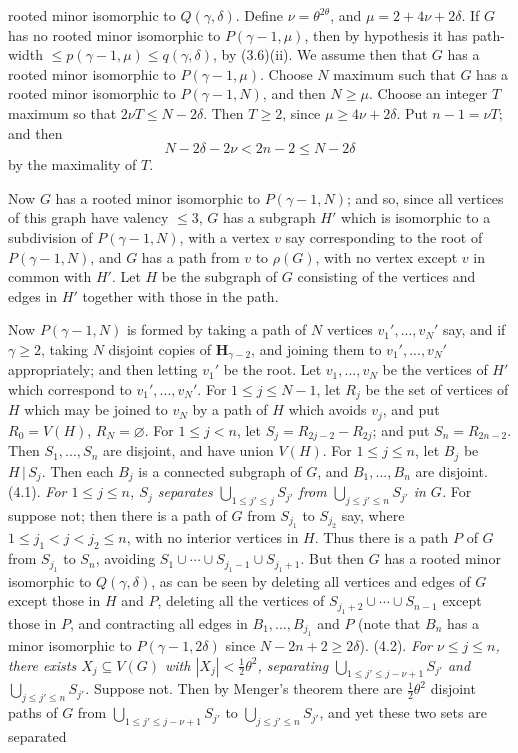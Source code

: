 \noindent rooted minor isomorphic to $Q(\gamma, \delta)$. Define $\nu=\theta^{2\theta}$, and $\mu=2+4\nu+2\delta$. If
$G$ has no rooted minor isomorphic to $P(\gamma-1, \mu)$, then by hypothesis it has
path-width $\le p(\gamma-1, \mu)\le q(\gamma, \delta)$, by (3.6)(ii). We assume then that $G$ has a
rooted minor isomorphic to $P(\gamma-1, \mu)$. Choose $N$ maximum such that $G$ has
a rooted minor isomorphic to $P(\gamma-1, N)$, and then $N\ge\mu$. Choose an integer
$T$ maximum so that $2\nu T\le N-2\delta$. Then $T\ge 2$, since $\mu\ge 4\nu+2\delta$. Put
$n-1=\nu T$; and then
\begin{equation*}
N-2\delta-2\nu<2n-2\le N-2\delta
\end{equation*}
by the maximality of $T$.

Now $G$ has a rooted minor isomorphic to $P(\gamma-1, N)$; and so, since all
vertices of this graph have valency ${\le}3$, $G$ has a subgraph $H'$ which is
isomorphic to a subdivision of $P(\gamma-1, N)$, with a vertex $v$ say
corresponding to the root of $P(\gamma-1, N)$, and $G$ has a path from $v$ to $\rho(G)$,
with no vertex except $v$ in common with $H'$. Let $H$ be the subgraph of $G$
consisting of the vertices and edges in $H'$ together with those in the path.

Now $P(\gamma-1, N)$ is formed by taking a path of $N$ vertices $v_1',..., v_N'$ say,
and if $\gamma\ge 2$, taking $N$ disjoint copies of $\mathbf{H}_{\gamma-2}$, and joining them to $v_1',..., v_N'$
appropriately; and then letting $v_1'$ be the root. Let $v_1,..., v_N$ be the vertices of
$H'$ which correspond to $v_1',..., v_N'$. For $1\le j\le N-1$, let $R_j$ be the set of
vertices of $H$ which may be joined to $v_N$ by a path of $H$ which avoids $v_j$, and
put $R_0=V(H)$, $R_N=\varnothing$. For $1\le j<n$, let $S_j=R_{2j-2}-R_{2j}$; and put
$S_n=R_{2n-2}$. Then $S_1,..., S_n$ are disjoint, and have union $V(H)$. For
$1\le j\le n$, let $B_j$ be $H\,|\,S_j$. Then each $B_j$ is a connected subgraph of $G$, and
$B_1,..., B_n$ are disjoint.
\stmt
(4.1). \textit{For $1\le j\le n$, $S_j$ separates $\bigcup_{1\le j'\le j}S_{j'}$ from $\bigcup_{j\le j'\le n}S_{j'}$ in $G$.}
\stmt
For suppose not; then there is a path of $G$ from $S_{j_1}$ to $S_{j_2}$ say, where
$1\le j_1<j<j_2\le n$, with no interior vertices in $H$. Thus there is a path $P$ of
$G$ from $S_{j_1}$ to $S_n$, avoiding $S_1\cup\cdots\cup S_{j_1-1}\cup S_{j_1+1}$. But then $G$ has a
rooted minor isomorphic to $Q(\gamma, \delta)$, as can be seen by deleting all vertices
and edges of $G$ except those in $H$ and $P$, deleting all the vertices of
$S_{j_1+2}\cup\cdots\cup S_{n-1}$ except those in $P$, and contracting all edges in $B_1,..., B_{j_1}$
and $P$ (note that $B_n$ has a minor isomorphic to $P(\gamma-1, 2\delta)$ since
$N-2n+2\ge 2\delta$).
\stmt
(4.2). \textit{For $\nu\le j\le n$, there exists $X_j\subseteq V(G)$ with $|X_j|<\frac12\theta^2$, separating
$\bigcup_{1\le j'\le j-\nu+1}S_{j'}$ and $\bigcup_{j\le j'\le n}S_{j'}$.}
\stmt
Suppose not. Then by Menger's theorem there are $\frac12\theta^2$ disjoint paths of $G$
from $\bigcup_{1\le j'\le j-\nu+1}S_{j'}$ to $\bigcup_{j\le j'\le n}S_{j'}$, and yet these two sets are separated
